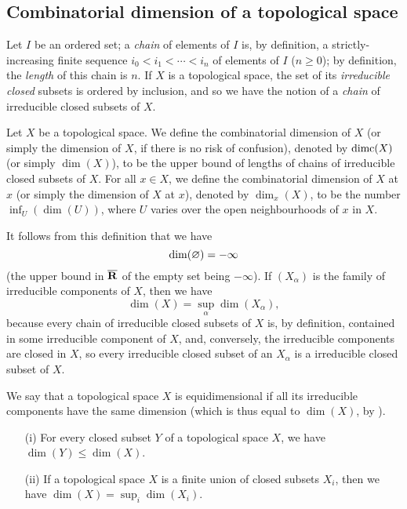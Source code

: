 \subsection{Combinatorial dimension of a topological space}
\label{subsection:0.14.1}

\begin{env}[14.1.1]
\label{0.14.1.1}
Let $I$ be an ordered set; a \emph{chain} of elements of $I$ is, by definition, a strictly-increasing finite sequence $i_0<i_1<\cdots<i_n$ of elements of $I$ ($n\geq 0$); by definition, the \emph{length} of this chain is $n$.
If $X$ is a topological space, the set of its \emph{irreducible closed} subsets is ordered by inclusion, and so we have the notion of a \emph{chain} of irreducible closed subsets of $X$.
\end{env}

\begin{definition}[14.1.2]
\label{0.14.1.2}
Let $X$ be a topological space.
We define the combinatorial dimension of $X$ (or simply the dimension of $X$, if there is no risk of confusion), denoted by $\operatorname{dimc}(X)$ (or simply $\dim(X)$), to be the upper bound of lengths of chains of irreducible closed subsets of $X$.
For all $x\in X$, we define the combinatorial dimension of $X$ at $x$ (or simply the dimension of $X$ at $x$), denoted by $\dim_x(X)$, to be the number $\inf_U(\dim(U))$, where $U$ varies over the open neighbourhoods of $x$ in $X$.
\end{definition}

It follows from this definition that we have
\[
  \dim(\varnothing)=-\infty
\]
(the upper bound in $\overline{\mathbf{R}}$ of the empty set being $-\infty$).
If $(X_\alpha)$ is the family of irreducible components of $X$, then we have
\[
\label{eq:0.14.1.2.1}
  \dim(X)=\sup_\alpha\dim(X_\alpha),
  \tag{14.1.2.1}
\]
because every chain of irreducible closed subsets of $X$ is, by definition, contained in some irreducible component of $X$, and, conversely, the irreducible components are closed in $X$, so every irreducible closed subset of an $X_\alpha$ is a irreducible closed subset of $X$.

\begin{definition}[14.1.3]
\label{0.14.1.3}
We say that a topological space $X$ is equidimensional if all its irreducible components have the same dimension (which is thus equal to $\dim(X)$, by ).
\end{definition}

\begin{proposition}[14.1.4]
\label{0.14.1.4}
\medskip\noindent
\begin{enumerate}
  \item[{\rm(i)}] For every closed subset $Y$ of a topological space $X$, we have $\dim(Y)\leq\dim(X)$.
  \item[{\rm(ii)}] If a topological space $X$ is a finite union of closed subsets $X_i$, then we have $\dim(X)=\sup_i\dim(X_i)$.
\end{enumerate}
\end{proposition}

